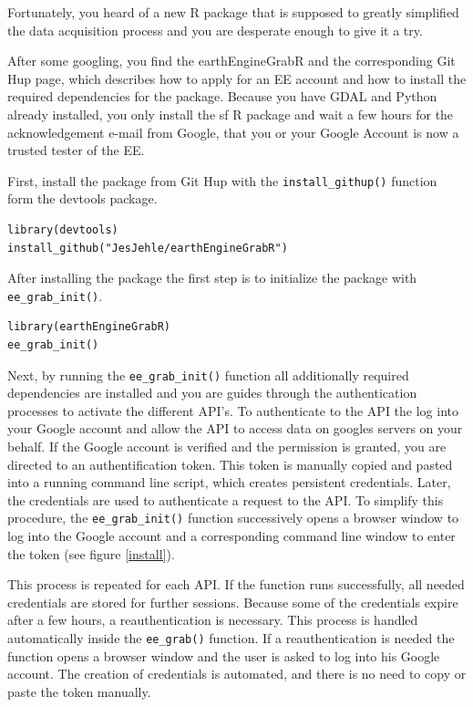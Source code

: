 Fortunately, you heard of a new R package that is supposed to greatly simplified the data acquisition process and you are desperate enough to give it a try. 

After some googling, you find the earthEngineGrabR and the corresponding Git Hup page, which describes how to apply for an EE account and how to install the required dependencies for the package. Because you have GDAL and Python already installed, you only install the sf R package and wait a few hours for the acknowledgement e-mail from Google, that you or your Google Account is now a trusted tester of the EE.

First, install the package from Git Hup with the \texttt{install\_githup()} function form the devtools package.

\begin{lstlisting}
library(devtools)
install_github("JesJehle/earthEngineGrabR")
\end{lstlisting}

After installing the package the first step is to initialize the package with \texttt{ee\_grab\_init()}. 

\begin{lstlisting}
library(earthEngineGrabR)
ee_grab_init()
\end{lstlisting}

Next, by running the \texttt{ee\_grab\_init()} function all additionally required dependencies are installed and you are guides through the authentication processes to activate the different API's. To authenticate to the API the log into your Google account and allow the API to access data on googles servers on your behalf. 
If the Google account is verified and the permission is granted, you are directed to an authentification token. This token is manually copied and pasted into a running command line script, which creates persistent credentials. Later, the credentials are used to authenticate a request to the API. To simplify this procedure, the \texttt{ee\_grab\_init()} function successively opens a browser window to log into the Google account and a corresponding command line window to enter the token (see figure \ref{install}). 

This process is repeated for each API. If the function runs successfully, all needed credentials are stored for further sessions. Because some of the credentials expire after a few hours, a reauthentication is necessary. This process is handled automatically inside the \texttt{ee\_grab()} function. If a reauthentication is needed the function opens a browser window and the user is asked to log into his Google account. The creation of credentials is automated, and there is no need to copy or paste the token manually.

